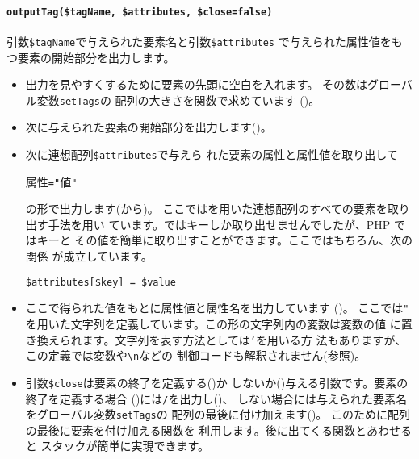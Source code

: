 \begin{itemize}
\paragraph{\texttt{outputTag(\$tagName, \$attributes, \$close=false)}}
       引数\texttt{\$tagName}で与えられた要素名と引数\texttt{\$attributes}
       で与えられた属性値をもつ要素の開始部分を出力します。
\begin{itemize}
 \item 出力を見やすくするために要素の先頭に空白を入れます。
       その数はグローバル変数\texttt{setTags}の
       配列の大きさを関数で求めています
       ()。
 \item 次に与えられた要素の開始部分を出力します()。
 \item 次に{連想配列}\texttt{\$attributes}で与えら
       れた要素の属性と属性値を取り出して
\begin{center}
 属性\texttt{="}値\texttt{"}
\end{center}
の形で出力します(から)。
 ここではを用いた連想配列のすべての要素を取り出す手法を用い
       ています。\JS ではキーしか取り出せませんでしたが、PHP ではキーと
       その値を簡単に取り出すことができます。ここではもちろん、次の関係
       が成立しています。
\begin{center}
 \texttt{\$attributes[\$key] = \$value}
\end{center}
 \item ここで得られた値をもとに属性値と属性名を出力しています
       ()。
       ここでは\texttt{"}%
       を用いた文字列を定義しています。この形の文字列内の変数は変数の値
       に置き換えられます。文字列を表す方法としては\texttt{'}を用いる方
       法もありますが、この定義では変数や\texttt{\textbackslash n}などの
       制御コードも解釈されません(参照)。
 \item 引数\texttt{\$close}は要素の終了を定義する()か
       しないか()与える引数です。要素の終了を定義する場合
       ()には\texttt{/}を出力し()、
       しない場合には与えられた要素名をグローバル変数\texttt{setTags}の
       配列の最後に付け加えます()。
       このために配列の最後に要素を付け加える関数を
       利用します。後に出てくる関数とあわせると
       スタックが簡単に実現できます。


\end{itemize}
\end{itemize}
